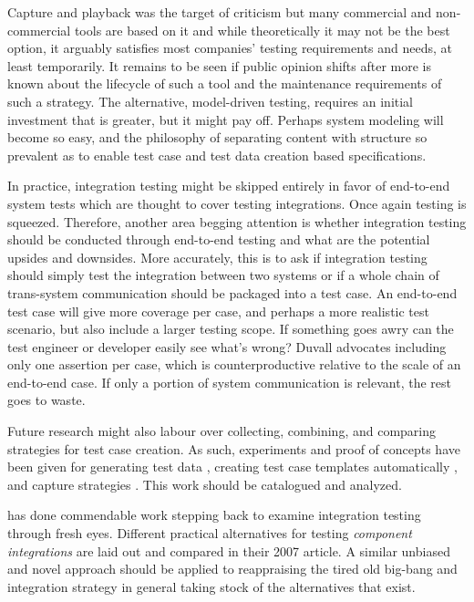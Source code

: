 \documentclass[12pt,a4paper,oneside,pdftex]{report}
\begin{document}
{%
Capture and playback was the target of criticism but many commercial and non-commercial tools are based on it and while theoretically it may not be the best option, it arguably satisfies most companies' testing requirements and needs, at least temporarily. It remains to be seen if public opinion shifts after more is known about the lifecycle of such a tool and the maintenance requirements of such a strategy. The alternative, model-driven testing, requires an initial investment that is greater, but it might pay off. Perhaps system modeling will become so easy, and the philosophy of separating content with structure so prevalent as to enable test case and test data creation based specifications.

In practice, integration testing might be skipped entirely in favor of end-to-end system tests which are thought to cover testing integrations. Once again testing is squeezed. Therefore, another area begging attention is whether integration testing should be conducted through end-to-end testing and what are the potential upsides and downsides. More accurately, this is to ask if integration testing should simply test the integration between two systems or if a whole chain of trans-system communication should be packaged into a test case. An end-to-end test case will give more coverage per case, and perhaps a more realistic test scenario, but also include a larger testing scope. If something goes awry can the test engineer or developer easily see what's wrong? Duvall advocates including only one assertion per case, which is counterproductive relative to the scale of an end-to-end case. If only a portion of system communication is relevant, the rest goes to waste.

Future research might also labour over collecting, combining, and comparing strategies for test case creation. As such, experiments and proof of concepts have been given for generating test data \citep{linnenkugel1990test}, creating test case templates automatically \citep{bai2005wsdl}, and capture strategies \citep{meszaros2003agile}. This work should be catalogued and analyzed.

\citet{rehman2007testing} has done commendable work stepping back to examine integration testing through fresh eyes. Different practical alternatives for testing \emph{component integrations} are laid out and compared in their 2007 article. A similar unbiased and novel approach should be applied to reappraising the tired old big-bang and integration strategy in general taking stock of the alternatives that exist.

}
\end{document}
